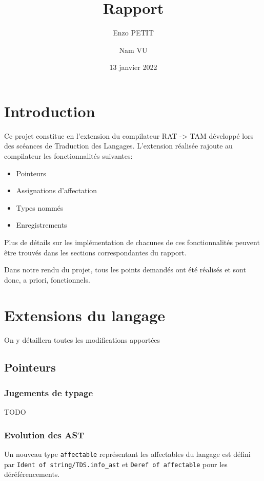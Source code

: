 \documentclass[headings=standardclasses,parskip=half]{scrartcl}
\title{Rapport}
\subtitle{}
\author{Enzo PETIT \and Nam VU}
\date{13 janvier 2022}
\begin{document}
\maketitle

\tableofcontents

\pagebreak

\section{Introduction}
Ce projet constitue en l'extension du compilateur RAT -> TAM développé lors des scéances de Traduction des Langages.
L'extension réalisée rajoute au compilateur les fonctionnalités suivantes:

\begin{itemize}
    \item Pointeurs
    \item Assignations d'affectation
    \item Types nommés
    \item Enregistrements
\end{itemize}

Plus de détails sur les implémentation de chacunes de ces fonctionnalités peuvent être trouvés dans les sections correspondantes du rapport.

Dans notre rendu du projet, tous les points demandés ont été réalisés et sont donc, a priori, fonctionnels.

\section{Extensions du langage}

On y détaillera toutes les modifications apportées

\subsection{Pointeurs}

\subsubsection*{Jugements de typage}

TODO

\subsubsection*{Evolution des AST}

Un nouveau type \texttt{affectable} représentant les affectables du
langage est défini par \texttt{Ident of string/TDS.info\_ast} et
\texttt{Deref of affectable} pour les déréférencements.
\end{document}
